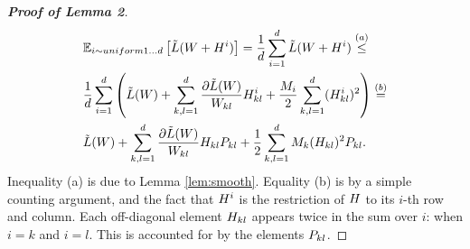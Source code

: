 \documentclass{article}
\begin{document}
%
\begin{proof}[\bf{Proof of Lemma 2}]
\begin{align*}
&\mathbb{E}_{i \sim uniform 1 \ldots d} \left[ \tilde{L}({W} + {H}^i) \right] = \frac{1}{d} \sum_{i=1}^d \tilde{L}({W} + {H}^i) \stackrel{(a)}{\leq} \\
& \frac{1}{d} \sum_{i=1}^d \left(\tilde{L}({W}) + \sum_{k,l=1}^d \frac{\partial \tilde{L}({W})}{{W}_{kl}} {H}_{kl}^i + \frac{M_i}{2} \sum_{k,l=1}^d  ({H}_{kl}^i)^2 \right) \stackrel{(b)}{=} \\
& \tilde{L}({W}) + \sum_{k,l=1}^d \frac{\partial \tilde{L}({W})}{{W}_{kl}} {H}_{kl} {P}_{kl} + \frac{1}{2} \sum_{k,l=1}^d M_k ({H}_{kl})^2 {P}_{kl}.
\end{align*}
Inequality (a) is due to Lemma \ref{lem:smooth}. Equality (b) is by a simple counting argument, and the fact that ${H}^i$ is the restriction of ${H}$ to its $i$-th row and column. Each off-diagonal element ${H}_{kl}$ appears twice in the sum over $i$: when $i=k$ and $i=l$. This is accounted for by the elements ${P}_{kl}$.
\end{proof}
\end{document}
